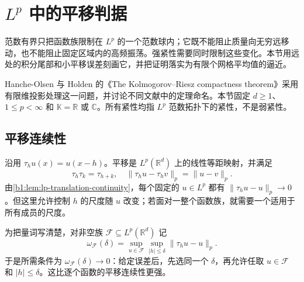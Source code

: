 \section{\texorpdfstring{\(L^p\)}{Lᵖ} 中的平移判据}
\label{b1:sec:2501}

范数有界只把函数族限制在 \(L^p\) 的一个范数球内；它既不能阻止质量向无穷远移动，也不能阻止固定区域内的高频振荡。强紧性需要同时限制这些变化。本节用远处的积分尾部和小平移误差刻画它，并把证明落实为有限个网格平均值的逼近。

\ProseParagraphBreak

Hanche-Olsen 与 Holden 的《The Kolmogorov--Riesz compactness theorem》\cite[Section 3, Theorem 5]{HancheOlsenHolden2010Compactness}采用有限维投影处理这一问题，并讨论不同文献中的定理命名。本节固定 \(d\geq1\)、\(1\leq p<\infty\) 和 \(\mathbb K=\mathbb R\) 或 \(\mathbb C\)。所有紧性均指 \(L^p\) 范数拓扑下的紧性，不是弱紧性。


\subsection{平移连续性}
\label{b1:subsec:250101}

沿用 \(\tau_hu(x)=u(x-h)\)。平移是 \(L^p(\mathbb R^d)\) 上的线性等距映射，并满足
\[
 \tau_h\tau_k=\tau_{h+k},\quad
 \|\tau_hu-\tau_hv\|_p=\|u-v\|_p.
\]
由\cref{b1:lem:lp-translation-continuity}，每个固定的 \(u\in L^p\) 都有
\(\|\tau_hu-u\|_p\to0\)。但这里允许控制 \(h\) 的尺度随 \(u\) 改变；若面对一整个函数族，就需要一个适用于所有成员的尺度。

\ProseParagraphBreak

为把量词写清楚，对非空族 \(\mathcal F\subseteq L^p(\mathbb R^d)\) 记
\[
 \omega_{\mathcal F}(\delta)
 =\sup_{u\in\mathcal F}\sup_{|h|\leq\delta}
       \|\tau_hu-u\|_p.
\]
于是所需条件为 \(\omega_{\mathcal F}(\delta)\to0\)：给定误差后，先选同一个 \(\delta\)，再允许任取 \(u\in\mathcal F\) 和 \(|h|\leq\delta\)。这比逐个函数的平移连续性更强。

\ProseParagraphBreak

